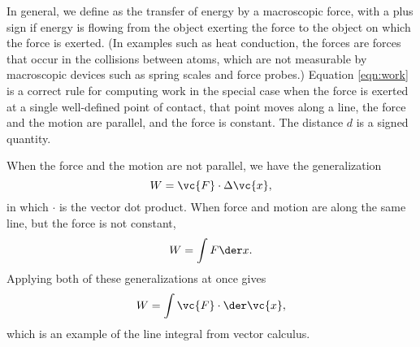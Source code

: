 In general, we define  as the transfer of energy by a macroscopic force, with a plus sign if energy
is flowing from the object exerting the force to the object on which the force is exerted.
(In examples such as heat conduction, the forces are forces that occur in the collisions between atoms,
which are not measurable by macroscopic devices such as spring scales and force probes.)
Equation \eqref{eqn:work} is a correct rule for computing work in the special case when the force is
exerted at a single well-defined point of contact, that point moves along a line, the force and the
motion are parallel, and the force is constant. The distance $d$ is a signed quantity.

When the force and the motion are not parallel, we have the generalization
\begin{equation}
  W = \vc{F}\cdot\Delta \vc{x},
\end{equation}
in which $\cdot$ is the vector dot product. When force and motion are along the same line,
but the force is not constant,
\begin{equation}
  W = \int F \der x.
\end{equation}
Applying both of these generalizations at once gives
\begin{equation}
  W = \int \vc{F} \cdot \der \vc{x},
\end{equation}
which is an example of the line integral from vector calculus.
